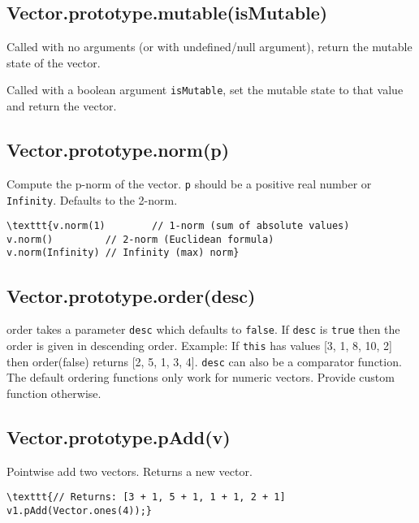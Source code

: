 \documentclass{article}
\begin{document}
    \subsection*{Vector.prototype.mutable(isMutable)}
    Called with no arguments (or with undefined/null argument), return the mutable
state of the vector.


Called with a boolean argument \texttt{isMutable}, set the mutable state to that value
and return the vector.


    \subsection*{Vector.prototype.norm(p)}
    Compute the p-norm of the vector. \texttt{p} should be a positive real
number or \texttt{Infinity}. Defaults to the 2-norm.


\begin{lstlisting}
\texttt{v.norm(1)        // 1-norm (sum of absolute values)
v.norm()         // 2-norm (Euclidean formula)
v.norm(Infinity) // Infinity (max) norm}\end{lstlisting}

    \subsection*{Vector.prototype.order(desc)}
    order takes a parameter \texttt{desc} which defaults to \texttt{false}.  If
\texttt{desc} is \texttt{true} then the order is given in descending order.
 Example:  If \texttt{this} has values [3, 1, 8, 10, 2] then
 order(false) returns [2, 5, 1, 3, 4].  \texttt{desc} can also be a
 comparator function.
 The default ordering functions only work for numeric vectors.
 Provide custom function otherwise.


    \subsection*{Vector.prototype.pAdd(v)}
    Pointwise add two vectors. Returns a new vector.


\begin{lstlisting}
\texttt{// Returns: [3 + 1, 5 + 1, 1 + 1, 2 + 1]
v1.pAdd(Vector.ones(4));}\end{lstlisting}
\end{document}
